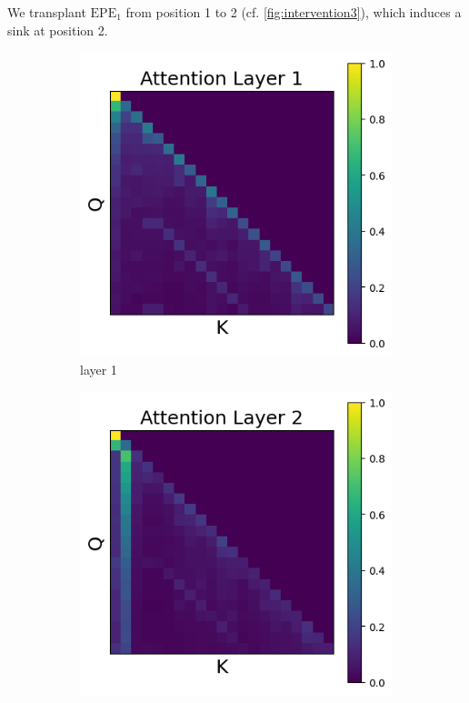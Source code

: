 \documentclass[11pt]{article}
\begin{document}
We transplant $\mathrm{EPE}_1$ from position 1 to 2 (cf. \cref{fig:intervention3}), which induces a sink at position 2.
\begin{figure}[t]
  \begin{subfigure}[t]{0.24\textwidth}
    \centering
    \includegraphics[width=1.4\columnwidth]{figures/intervention3/layer_1.png}
    \caption{layer 1}
  \end{subfigure}\hfill
  \begin{subfigure}[t]{0.24\textwidth}
    \centering
    \includegraphics[width=1.4\columnwidth]{figures/intervention3/layer_2.png}

\end{subfigure}
\end{figure}
\end{document}
